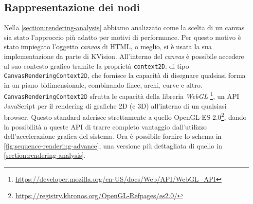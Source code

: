 \subsection{Rappresentazione dei nodi}\label{subsection:node-representation}
Nella \cref{section:rendering-analysis} abbiamo analizzato come la scelta di un canvas sia stato l'approccio più adatto per motivi di performance. Per questo motivo è stato impiegato l'oggetto \textit{canvas} di HTML, o meglio, si è usata la sua implementazione da parte di KVision. All'interno del \textit{canvas} è possibile accedere al suo contesto grafico tramite la proprietà \texttt{context2D}, di tipo \texttt{CanvasRenderingContext2D}, che fornisce la capacità di disegnare qualsiasi forma in un piano bidimensionale, combinando linee, archi, curve e altro. \texttt{CanvasRenderingContext2D} sfrutta le capacità della libreria \textit{WebGL} \footnote{\url{https://developer.mozilla.org/en-US/docs/Web/API/WebGL_API}}, un \ac{API} JavaScript per il rendering di grafiche 2D (e 3D) all'interno di un qualsiasi browser. Questo standard aderisce strettamente a quello OpenGL ES 2.0\footnote{\url{https://registry.khronos.org/OpenGL-Refpages/es2.0/}}, dando la possibilità a queste \ac{API} di trarre completo vantaggio dall'utilizzo dell'accelerazione grafica del sistema.
Ora è possibile fornire lo schema in \cref{fig:sequence-rendering-advance}, una versione più dettagliata di quello in \cref{section:rendering-analysis}. 

